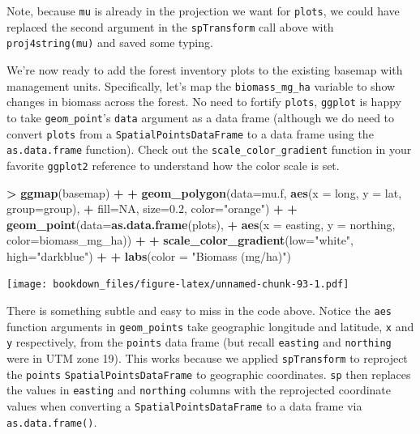 \documentclass[]{krantz}
\makeatletter
\newenvironment{Shaded}{\begin{snugshade}}{\end{snugshade}}
\newcommand{\KeywordTok}[1]{\textcolor[rgb]{0.27,0.27,0.27}{\textbf{#1}}}
\newcommand{\DataTypeTok}[1]{\textcolor[rgb]{0.27,0.27,0.27}{#1}}
\newcommand{\FloatTok}[1]{\textcolor[rgb]{0.06,0.06,0.06}{#1}}
\newcommand{\StringTok}[1]{\textcolor[rgb]{0.5,0.5,0.5}{#1}}
\newcommand{\OtherTok}[1]{\textcolor[rgb]{0.37,0.37,0.37}{#1}}
\newcommand{\OperatorTok}[1]{\textcolor[rgb]{0.43,0.43,0.43}{\textbf{#1}}}
\newcommand{\NormalTok}[1]{#1}
\newenvironment{kframe}{%
\medskip{}
\setlength{\fboxsep}{.8em}
 \def\at@end@of@kframe{}%
 \ifinner\ifhmode%
  \def\at@end@of@kframe{\end{minipage}}%
  \begin{minipage}{\columnwidth}%
 \fi\fi%
 \def\FrameCommand##1{\hskip\@totalleftmargin \hskip-\fboxsep
 \colorbox{shadecolor}{##1}\hskip-\fboxsep
     \hskip-\linewidth \hskip-\@totalleftmargin \hskip\columnwidth}%
 \MakeFramed {\advance\hsize-\width
   \@totalleftmargin\z@ \linewidth\hsize
   \@setminipage}}%
 {\par\unskip\endMakeFramed%
 \at@end@of@kframe}
\renewenvironment{Shaded}{\begin{kframe}}{\end{kframe}}
\theoremstyle{definition}
\theoremstyle{definition}
\theoremstyle{definition}
\theoremstyle{remark}
\makeatother
\begin{document}
Note, because \texttt{mu} is already in the projection we want for
\texttt{plots}, we could have replaced the second argument in the
\texttt{spTransform} call above with \texttt{proj4string(mu)} and saved
some typing.

We're now ready to add the forest inventory plots to the existing
basemap with management units. Specifically, let's map the
\texttt{biomass\_mg\_ha} variable to show changes in biomass across the
forest. No need to fortify \texttt{plots}, \texttt{ggplot} is happy to
take \texttt{geom\_point}'s \texttt{data} argument as a data frame
(although we do need to convert \texttt{plots} from a
\texttt{SpatialPointsDataFrame} to a data frame using the
\texttt{as.data.frame} function). Check out the
\texttt{scale\_color\_gradient} function in your favorite
\texttt{ggplot2} reference to understand how the color scale is set.

\begin{Shaded}
\begin{Highlighting}[]
\OperatorTok{>}\StringTok{ }\KeywordTok{ggmap}\NormalTok{(basemap) }\OperatorTok{+}
\OperatorTok{+}\StringTok{     }\KeywordTok{geom_polygon}\NormalTok{(}\DataTypeTok{data=}\NormalTok{mu.f, }\KeywordTok{aes}\NormalTok{(}\DataTypeTok{x =}\NormalTok{ long, }\DataTypeTok{y =}\NormalTok{ lat, }\DataTypeTok{group=}\NormalTok{group), }
\OperatorTok{+}\StringTok{                  }\DataTypeTok{fill=}\OtherTok{NA}\NormalTok{, }\DataTypeTok{size=}\FloatTok{0.2}\NormalTok{, }\DataTypeTok{color=}\StringTok{"orange"}\NormalTok{) }\OperatorTok{+}
\OperatorTok{+}\StringTok{     }\KeywordTok{geom_point}\NormalTok{(}\DataTypeTok{data=}\KeywordTok{as.data.frame}\NormalTok{(plots), }
\OperatorTok{+}\StringTok{                }\KeywordTok{aes}\NormalTok{(}\DataTypeTok{x =}\NormalTok{ easting, }\DataTypeTok{y =}\NormalTok{ northing, }\DataTypeTok{color=}\NormalTok{biomass_mg_ha)) }\OperatorTok{+}\StringTok{ }
\OperatorTok{+}\StringTok{     }\KeywordTok{scale_color_gradient}\NormalTok{(}\DataTypeTok{low=}\StringTok{"white"}\NormalTok{, }\DataTypeTok{high=}\StringTok{"darkblue"}\NormalTok{) }\OperatorTok{+}
\OperatorTok{+}\StringTok{     }\KeywordTok{labs}\NormalTok{(}\DataTypeTok{color =} \StringTok{"Biomass (mg/ha)"}\NormalTok{)}
\end{Highlighting}
\end{Shaded}

\texttt{[image: bookdown\_files/figure-latex/unnamed-chunk-93-1.pdf]}

There is something subtle and easy to miss in the code above. Notice the
\texttt{aes} function arguments in \texttt{geom\_points} take geographic
longitude and latitude, \texttt{x} and \texttt{y} respectively, from the
\texttt{points} data frame (but recall \texttt{easting} and
\texttt{northing} were in UTM zone 19). This works because we applied
\texttt{spTransform} to reproject the \texttt{points}
\texttt{SpatialPointsDataFrame} to geographic coordinates. \texttt{sp}
then replaces the values in \texttt{easting} and \texttt{northing}
columns with the reprojected coordinate values when converting a
\texttt{SpatialPointsDataFrame} to a data frame via
\texttt{as.data.frame()}.
\end{document}
